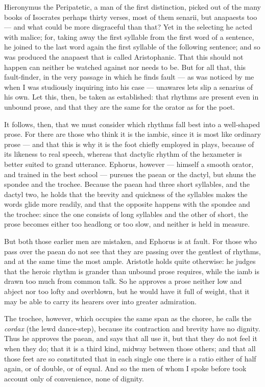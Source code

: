  Hieronymus the Peripatetic, a man of the first distinction, picked out of the many books of Isocrates perhaps thirty verses, most of them senarii, but anapaests too — and what could be more disgraceful than that? Yet in the selecting he acted with malice; for, taking away the first syllable from the first word of a sentence, he joined to the last word again the first syllable of the following sentence; and so was produced the anapaest that is called Aristophanic. That this should not happen can neither be watched against nor needs to be. But for all that, this fault-finder, in the very passage in which he finds fault — as was noticed by me when I was studiously inquiring into his case — unawares lets slip a senarius of his own. Let this, then, be taken as established: that rhythms are present even in unbound prose, and that they are the same for the orator as for the poet.

 It follows, then, that we must consider which rhythms fall best into a well-shaped prose. For there are those who think it is the iambic, since it is most like ordinary prose — and that this is why it is the foot chiefly employed in plays, because of its likeness to real speech, whereas that dactylic rhythm of the hexameter is better suited to grand utterance. Ephorus, however — himself a smooth orator, and trained in the best school — pursues the paean or the dactyl, but shuns the spondee and the trochee. Because the paean had three short syllables, and the dactyl two, he holds that the brevity and quickness of the syllables makes the words glide more readily, and that the opposite happens with the spondee and the trochee: since the one consists of long syllables and the other of short, the prose becomes either too headlong or too slow, and neither is held in measure.

 But both those earlier men are mistaken, and Ephorus is at fault. For those who pass over the paean do not see that they are passing over the gentlest of rhythms, and at the same time the most ample. Aristotle holds quite otherwise: he judges that the heroic rhythm is grander than unbound prose requires, while the iamb is drawn too much from common talk. So he approves a prose neither low and abject nor too lofty and overblown, but he would have it full of weight, that it may be able to carry its hearers over into greater admiration.

 The trochee, however, which occupies the same span as the choree, he calls the \textit{cordax} (the lewd dance-step), because its contraction and brevity have no dignity. Thus he approves the paean, and says that all use it, but that they do not feel it when they do; that it is a third kind, midway between those others; and that all those feet are so constituted that in each single one there is a ratio either of half again, or of double, or of equal. And so the men of whom I spoke before took account only of convenience, none of dignity.

